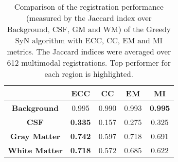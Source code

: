\begin{table}[h!]
  \centering
  {\small
    \begin{tabular}{ccccc}
    \toprule
           & \textbf{ECC} & \textbf{CC} & \textbf{EM} & \textbf{MI} \\
    \midrule
    \textbf{Background}   & 0.995 & 0.990 & 0.993 & \textbf{0.995} \\
    \textbf{CSF}          & \textbf{0.335} & 0.157 & 0.275 & 0.325 \\
    \textbf{Gray Matter}  & \textbf{0.742} & 0.597 & 0.718 & 0.691 \\
    \textbf{White Matter} & \textbf{0.718} & 0.572 & 0.685 & 0.622 \\
    \bottomrule
    \end{tabular}}%
  \caption{{\small Comparison of the registration performance (measured by the Jaccard index over Background, CSF, GM and WM) of the Greedy SyN algorithm with ECC, CC, EM and MI metrics. The Jaccard indices were averaged over 612 multimodal registrations. Top performer for each region is highlighted.}}
  \label{tab:multimodal_results_segTri_fill}%
\end{table}%
